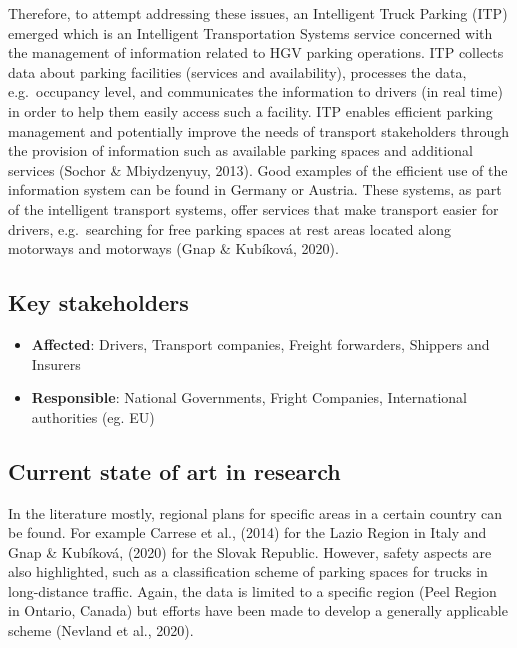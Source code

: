 \documentclass[
]{book}
\providecommand{\tightlist}{%
  \setlength{\itemsep}{0pt}\setlength{\parskip}{0pt}}
\begin{document}
Therefore, to attempt addressing these issues, an Intelligent Truck Parking (ITP) emerged which is an Intelligent Transportation Systems service concerned with the management of information related to HGV parking operations. ITP collects data about parking facilities (services and availability), processes the data, e.g.~occupancy level, and communicates the information to drivers (in real time) in order to help them easily access such a facility. ITP enables efficient parking management and potentially improve the needs of transport stakeholders through the provision of information such as available parking spaces and additional services (Sochor \& Mbiydzenyuy, 2013).
Good examples of the efficient use of the information system can be found in Germany or Austria. These systems, as part of the intelligent transport systems, offer services that make transport easier for drivers, e.g.~searching for free parking spaces at rest areas located along motorways and motorways (Gnap \& Kubíková, 2020).

\hypertarget{key-stakeholders-17}{%
\subsection*{Key stakeholders}\label{key-stakeholders-17}}

\begin{itemize}
\tightlist
\item
  \textbf{Affected}: Drivers, Transport companies, Freight forwarders, Shippers and Insurers
\item
  \textbf{Responsible}: National Governments, Fright Companies, International authorities (eg. EU)
\end{itemize}

\hypertarget{current-state-of-art-in-research-17}{%
\subsection*{Current state of art in research}\label{current-state-of-art-in-research-17}}

In the literature mostly, regional plans for specific areas in a certain country can be found. For example Carrese et al., (2014) for the Lazio Region in Italy and Gnap \& Kubíková, (2020) for the Slovak Republic. However, safety aspects are also highlighted, such as a classification scheme of parking spaces for trucks in long-distance traffic. Again, the data is limited to a specific region (Peel Region in Ontario, Canada) but efforts have been made to develop a generally applicable scheme (Nevland et al., 2020).
\end{document}
